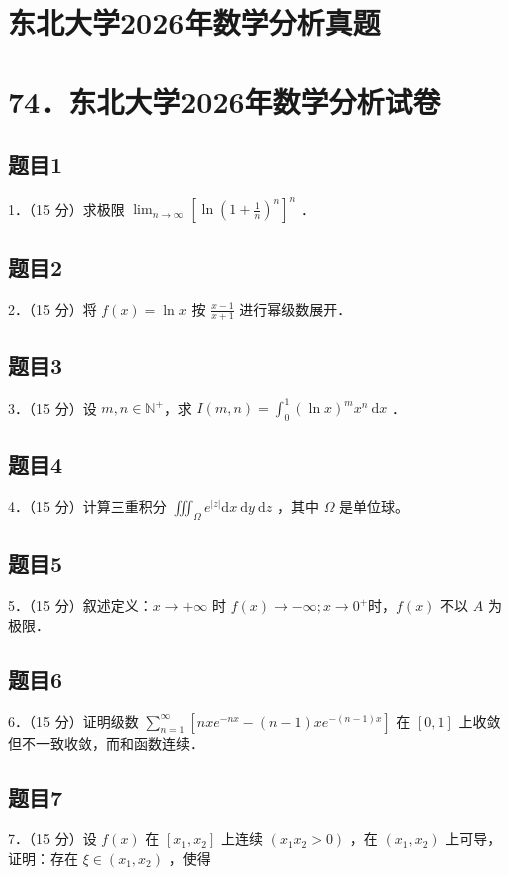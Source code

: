 \documentclass{article}
\begin{document}
\section*{东北大学2026年数学分析真题}
\section*{74．东北大学2026年数学分析试卷}

\subsection{题目1}
1．（15 分）求极限 \(\lim _{n \rightarrow \infty}\left[\ln \left(1+\frac{1}{n}\right)^{n}\right]^{n}\) ．

\subsection{题目2}
2．（15 分）将 \(f(x)=\ln x\) 按 \(\frac{x-1}{x+1}\) 进行幂级数展开．

\subsection{题目3}
3．（15 分）设 \(m, n \in \mathbb{N}^{+}\)，求 \(I(m, n)=\int_{0}^{1}(\ln x)^{m} x^{n} \mathrm{~d} x\) ．

\subsection{题目4}
4．（15 分）计算三重积分 \(\iiint_{\Omega} e^{|z|} \mathrm{d} x \mathrm{~d} y \mathrm{~d} z\) ，其中 \(\Omega\) 是单位球。

\subsection{题目5}
5．（15 分）叙述定义：\(x \rightarrow+\infty\) 时 \(f(x) \rightarrow-\infty ; x \rightarrow 0^{+}\)时，\(f(x)\) 不以 \(A\) 为极限．

\subsection{题目6}
6．（15 分）证明级数 \(\sum_{n=1}^{\infty}\left[n x e^{-n x}-(n-1) x e^{-(n-1) x}\right]\) 在 \([0,1]\) 上收敛但不一致收敛，而和函数连续．

\subsection{题目7}
7．（15 分）设 \(f(x)\) 在 \(\left[x_{1}, x_{2}\right]\) 上连续 \(\left(x_{1} x_{2}>0\right)\) ，在 \(\left(x_{1}, x_{2}\right)\) 上可导，证明：存在 \(\xi \in\left(x_{1}, x_{2}\right)\) ，使得
\end{document}
